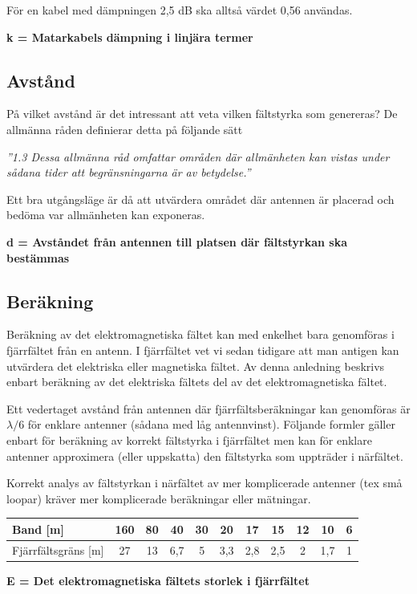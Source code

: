 För en kabel med dämpningen 2,5 dB ska alltså värdet 0,56 användas.

\textbf{k = Matarkabels dämpning i linjära termer}

\subsection{Avstånd}

På vilket avstånd är det intressant att veta vilken fältstyrka som genereras?
De allmänna råden definierar detta på följande sätt

\emph{”1.3 Dessa allmänna råd omfattar områden där allmänheten kan vistas under sådana tider att begränsningarna är av betydelse.”}

Ett bra utgångsläge är då att utvärdera området där antennen är placerad och bedöma var allmänheten kan exponeras.

\textbf{d = Avståndet från antennen till platsen där fältstyrkan ska bestämmas}

\subsection{Beräkning}

Beräkning av det elektromagnetiska fältet kan med enkelhet bara
genomföras i fjärrfältet från en antenn. I fjärrfältet vet vi sedan
tidigare att man antigen kan utvärdera det elektriska eller
magnetiska fältet. Av denna anledning beskrivs enbart beräkning av
det elektriska fältets del av det elektromagnetiska fältet.

Ett vedertaget avstånd från antennen där fjärrfältsberäkningar kan
genomföras är \(\lambda/6\) för enklare antenner (sådana med låg
antennvinst). Följande formler gäller enbart för beräkning av korrekt
fältstyrka i fjärrfältet men kan för enklare antenner approximera
(eller uppskatta) den fältstyrka som uppträder i närfältet.

Korrekt analys av fältstyrkan i närfältet av mer komplicerade antenner
(tex små loopar) kräver mer komplicerade beräkningar eller mätningar.

\begin{tabular}{|l|c|c|c|c|c|c|c|c|c|c|}
\hline
Band [m] & 160 & 80 & 40 & 30 & 20 & 17 & 15 & 12 & 10 & 6 \\ \hline
Fjärrfältsgräns [m] & 27 & 13 & 6,7 & 5 & 3,3 & 2,8 & 2,5 & 2 & 1,7 & 1 \\ \hline
\end{tabular}

\textbf{E = Det elektromagnetiska fältets storlek i fjärrfältet}

